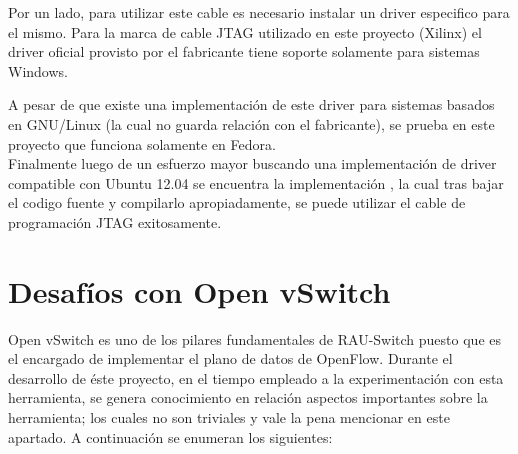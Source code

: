 Por un lado, para utilizar este cable es necesario instalar un driver especifico para el mismo. Para la marca de cable JTAG utilizado en este proyecto (Xilinx) el driver oficial provisto por el fabricante tiene soporte solamente para sistemas Windows.

A pesar de que existe una implementaci\'on de este driver para sistemas basados en GNU/Linux (la cual no guarda relación con el fabricante), se prueba en este proyecto que funciona solamente en Fedora.\\

Finalmente luego de un esfuerzo mayor buscando una implementaci\'on de driver compatible con Ubuntu 12.04 se encuentra la implementaci\'on \cite{JtagD}, la cual tras bajar el codigo fuente y compilarlo apropiadamente, se puede utilizar el cable de programaci\'on JTAG exitosamente.

\section{Desaf\'ios con Open vSwitch}
\label{apendiceB5}

Open vSwitch es uno de los pilares fundamentales de RAU-Switch puesto que es el encargado de implementar el plano de datos de OpenFlow. Durante el desarrollo de \'este proyecto, en el tiempo empleado a la experimentaci\'on con esta herramienta, se genera conocimiento en relaci\'on aspectos importantes sobre la herramienta; los cuales no son triviales y vale la pena mencionar en este apartado. A continuaci\'on se enumeran los siguientes:\\ 

